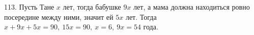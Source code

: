 113. Пусть Тане $x$ лет, тогда бабушке $9x$ лет, а мама должна находиться ровно посередине между ними, значит ей $5x$ лет. Тогда $x+9x+5x=90,\ 15x=90,\ x=6,\ 9x=54$ года.\\
